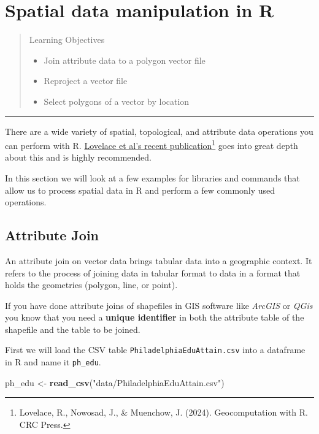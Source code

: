 \documentclass[
]{book}
\newenvironment{Shaded}{\begin{snugshade}}{\end{snugshade}}
\newcommand{\FunctionTok}[1]{\textcolor[rgb]{0.13,0.29,0.53}{\textbf{#1}}}
\newcommand{\NormalTok}[1]{#1}
\newcommand{\OtherTok}[1]{\textcolor[rgb]{0.56,0.35,0.01}{#1}}
\newcommand{\StringTok}[1]{\textcolor[rgb]{0.31,0.60,0.02}{#1}}
\providecommand{\tightlist}{%
  \setlength{\itemsep}{0pt}\setlength{\parskip}{0pt}}
\begin{document}
\hypertarget{spatialops}{%
\chapter{Spatial data manipulation in R}\label{spatialops}}

\begin{quote}
Learning Objectives

\begin{itemize}
\tightlist
\item
  Join attribute data to a polygon vector file
\item
  Reproject a vector file
\item
  Select polygons of a vector by location
\end{itemize}
\end{quote}

\begin{center}\rule{0.5\linewidth}{0.5pt}\end{center}

There are a wide variety of spatial, topological, and attribute data operations you can perform with R. \href{https://r.geocompx.org/}{Lovelace et al's recent publication}\footnote{Lovelace, R., Nowosad, J., \& Muenchow, J. (2024). Geocomputation with R. CRC Press.} goes into great depth about this and is highly recommended.

In this section we will look at a few examples for libraries and commands that allow us to process spatial data in R and perform a few commonly used operations.

\hypertarget{attribute-join}{%
\section{Attribute Join}\label{attribute-join}}

An attribute join on vector data brings tabular data into a geographic context. It refers to the process of joining data in tabular format to data in a format that holds the geometries (polygon, line, or point).

If you have done attribute joins of shapefiles in GIS software like \emph{ArcGIS} or \emph{QGis} you know that you need a \textbf{unique identifier} in both the attribute table of the shapefile and the table to be joined.

First we will load the CSV table \texttt{PhiladelphiaEduAttain.csv} into a dataframe in R and name it \texttt{ph\_edu}.

\begin{Shaded}
\begin{Highlighting}[]
\NormalTok{ph\_edu }\OtherTok{\textless{}{-}} \FunctionTok{read\_csv}\NormalTok{(}\StringTok{"data/PhiladelphiaEduAttain.csv"}\NormalTok{)}
\end{Highlighting}
\end{Shaded}
\end{document}
